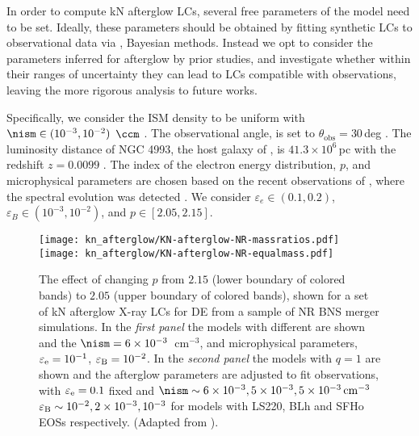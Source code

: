 In order to compute \ac{kN} afterglow \acp{LC}, 
several free parameters of the model need to be set. 
Ideally, these parameters should be obtained by fitting synthetic \acp{LC} to  
observational data via \eg{}, Bayesian methods. Instead we opt to consider the 
parameters inferred for \GRB{} afterglow by prior studies, and investigate whether 
within their ranges of uncertainty they can lead to \acp{LC} compatible with observations, 
leaving the more rigorous analysis to future works.

Specifically, we consider the \ac{ISM} density to be uniform with 
$\nism\in(10^{-3}, 10^{-2})$ $\ccm$ \citep{Hajela:2019mjy}. 
The observational angle, 
is set to $\theta_{\text{obs}}=30\,$deg \citep{TheLIGOScientific:2017qsa}.
The luminosity distance of NGC 4993, the host galaxy of \GW{}, is $41.3\times10^{6}\,$pc 
with the redshift $z=0.0099$ \citep{Hjorth:2017yza}.
%
The index of the electron energy distribution, $p$, and microphysical parameters are 
chosen based on the recent observations of \GRB{}, where the spectral evolution 
was detected \citep{Hajela:2021faz}.  
%
We consider 
$\varepsilon_e\in(0.1, 0.2)$,
$\varepsilon_B\in(10^{-3}, 10^{-2})$, and 
$p\in[2.05,2.15]$.


\begin{figure}
    \begin{center}
        \texttt{[image: kn\_afterglow/KN-afterglow-NR-massratios.pdf]}
        \hspace{-5mm}
        \texttt{[image: kn\_afterglow/KN-afterglow-NR-equalmass.pdf]}
        \caption{
            The effect of changing $p$ from $2.15$ (lower boundary of colored bands) to 
            $2.05$ (upper boundary of colored bands), shown for a set of \ac{kN} afterglow 
            X-ray \acp{LC} for \ac{DE} from a sample of \ac{NR} \ac{BNS} merger simulations.
            In the \emph{first panel} the models with different \mr{} are shown and the 
            $\nism=6\times10^{-3}$~cm$^{-3}$, and microphysical parameters, 
            $\varepsilon_{\rm e}=10^{-1}$, $\varepsilon_{\rm B}=10^{-2}$.
            In the \emph{second panel} the models with $q=1$ are shown and the afterglow
            parameters are adjusted to fit observations, 
            with $\varepsilon_{\rm e}=0.1$ fixed and  
            $\nism\sim 6\times 10^{-3}, 5\times 10^{-3},5\times 10^{-3}\,\rm{cm^{-3}}$
            $\varepsilon_{\rm B}\sim 10^{-2},2\times 10^{-3},10^{-3}$ for models with 
            LS220, BLh and SFHo \acp{EOS} respectively.
            (Adapted from \citet{Hajela:2021faz}).
        } \label{fig:kn_afterglow}
    \end{center}
\end{figure}

